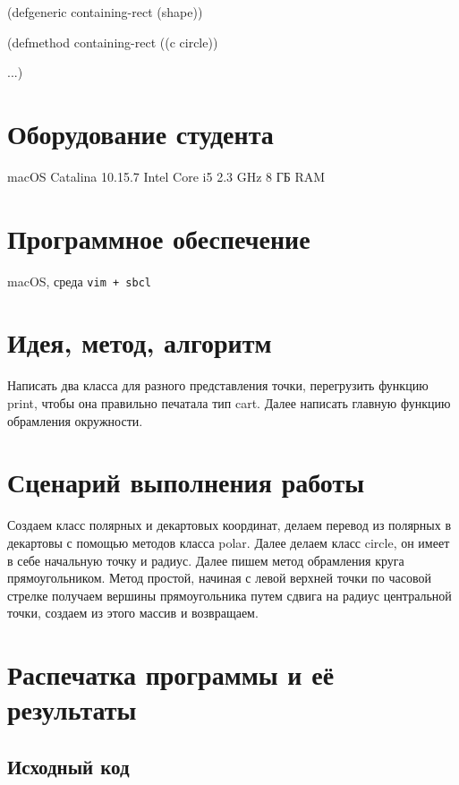 \documentclass[15pt]{extarticle}
\begin{document}
(defgeneric containing-rect (shape))

(defmethod containing-rect ((c circle))

  ...)

\section{Оборудование студента}
macOS Catalina 10.15.7 Intel Core i5 2.3 GHz 8 ГБ RAM

\section{Программное обеспечение}
macOS, среда {\tt vim + sbcl}

\section{Идея, метод, алгоритм}
Написать два класса для разного представления точки, перегрузить функцию print, чтобы она правильно печатала тип cart.  Далее написать главную функцию обрамления окружности.

\section{Сценарий выполнения работы}
Создаем класс полярных и декартовых координат, делаем перевод из полярных в декартовы с помощью методов класса polar. Далее делаем класс circle, он имеет в себе начальную точку и радиус. Далее пишем метод обрамления круга прямоугольником. Метод простой, начиная с левой верхней точки по часовой стрелке получаем вершины прямоугольника путем сдвига на радиус центральной точки, создаем из этого массив и возвращаем.

\section{Распечатка программы и её результаты}

\subsection{Исходный код}
\end{document}
